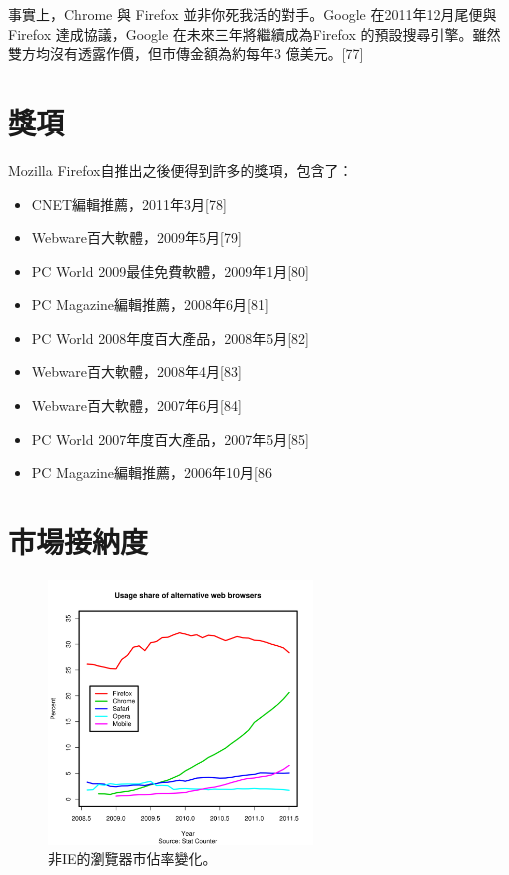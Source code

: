 \documentclass[12pt]{article}
\begin{document}
事實上，Chrome 與 Firefox 並非你死我活的對手。Google 在2011年12月尾便與Firefox 達成協議，Google 在未來三年將繼續成為Firefox 的預設搜尋引擎。雖然雙方均沒有透露作價，但市傳金額為約每年3 億美元。[77]

\section{獎項}

Mozilla Firefox自推出之後便得到許多的獎項，包含了：

\begin{itemize}
\item CNET編輯推薦，2011年3月[78]
\item Webware百大軟體，2009年5月[79]
\item PC World 2009最佳免費軟體，2009年1月[80]
\item PC Magazine編輯推薦，2008年6月[81]
\item PC World 2008年度百大產品，2008年5月[82]
\item Webware百大軟體，2008年4月[83]
\item Webware百大軟體，2007年6月[84]
\item PC World 2007年度百大產品，2007年5月[85]
\item PC Magazine編輯推薦，2006年10月[86
\end{itemize}

\section{市場接納度}

\begin{figure}
  \begin{center}
    \includegraphics[width=70mm]{Usage}
  \end{center}
  \caption{非IE的瀏覽器市佔率變化。}
\end{figure}
\end{document}
